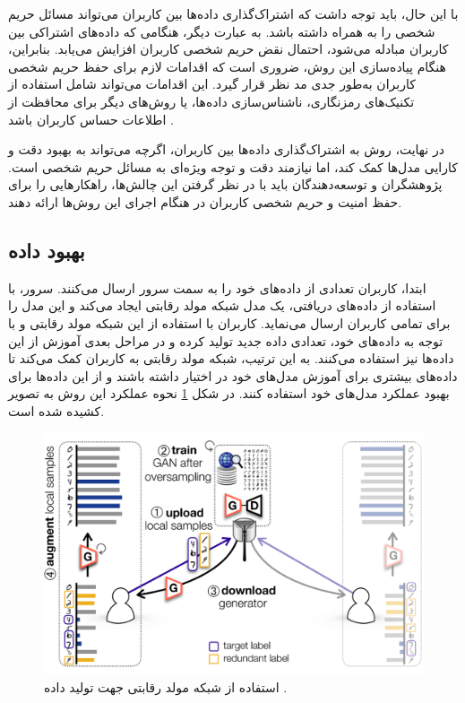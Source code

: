 با این حال، باید توجه داشت که اشتراک‌گذاری داده‌ها بین کاربران می‌تواند مسائل حریم شخصی را به همراه داشته باشد. به عبارت دیگر، هنگامی که داده‌های اشتراکی بین کاربران مبادله می‌شود، احتمال نقض حریم شخصی کاربران افزایش می‌یابد. بنابراین، هنگام پیاده‌سازی این روش، ضروری است که اقدامات لازم برای حفظ حریم شخصی کاربران به‌طور جدی مد نظر قرار گیرد. این اقدامات می‌تواند شامل استفاده از تکنیک‌های رمزنگاری، ناشناس‌سازی داده‌ها، یا روش‌های دیگر برای محافظت از اطلاعات حساس کاربران باشد
\cite{ma2022state}.

در نهایت، روش به اشتراک‌گذاری داده‌ها بین کاربران، اگرچه می‌تواند به بهبود دقت و کارایی مدل‌ها کمک کند، اما نیازمند دقت و توجه ویژه‌ای به مسائل حریم شخصی است. پژوهشگران و توسعه‌دهندگان باید با در نظر گرفتن این چالش‌ها، راهکارهایی را برای حفظ امنیت و حریم شخصی کاربران در هنگام اجرای این روش‌ها ارائه دهند.

\subsection{
	بهبود داده%
}
ابتدا، کاربران تعدادی از داده‌های خود را به سمت سرور ارسال می‌کنند. سرور، با استفاده از داده‌های دریافتی، یک مدل شبکه مولد رقابتی%
ایجاد می‌کند و این مدل را برای تمامی کاربران ارسال می‌نماید. کاربران با استفاده از این شبکه مولد رقابتی و با توجه به داده‌های خود، تعدادی داده جدید تولید کرده و در مراحل بعدی آموزش از این داده‌ها نیز استفاده می‌کنند. به این ترتیب، شبکه مولد رقابتی به کاربران کمک می‌کند تا داده‌های بیشتری برای آموزش مدل‌های خود در اختیار داشته باشند و از این داده‌ها برای بهبود عملکرد مدل‌های خود استفاده کنند. در شکل
\ref{gan}
نحوه عملکرد این روش به تصویر کشیده شده است.



\begin{figure}[t]
	\centering
	\includegraphics[scale=0.9]{images/chap3/generative_adversarial_network.png}%
	\caption{%
		استفاده از شبکه مولد رقابتی جهت تولید داده
		\cite{jeong2018communication}%
		.
	}
	\label{gan}
	\centering
\end{figure}


